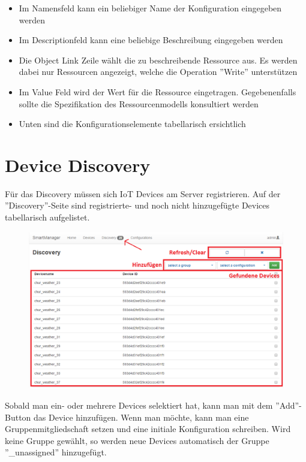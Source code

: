 \begin{itemize}
\item Im Namensfeld kann ein beliebiger Name der Konfiguration eingegeben werden
\item Im Descriptionfeld kann eine beliebige Beschreibung eingegeben werden
\item Die Object Link Zeile wählt die zu beschreibende Ressource aus. Es werden dabei nur Ressourcen angezeigt, welche die Operation ''Write'' unterstützen
\item Im Value Feld wird der Wert für die Ressource eingetragen. Gegebenenfalls sollte die Spezifikation des Ressourcenmodells konsultiert werden
\item Unten sind die Konfigurationselemente tabellarisch ersichtlich
\end{itemize}

\section{Device Discovery}
Für das Discovery müssen sich IoT Devices am Server registrieren. Auf der ''Discovery''-Seite sind registrierte- und noch nicht hinzugefügte Devices tabellarisch aufgelistet.

\begin{figure}[H]
\includegraphics[scale=0.57]{../05_Schlussbericht/images/benutzeranleitung/discovery.png}
\end{figure}  

Sobald man ein- oder mehrere Devices selektiert hat, kann man mit dem ''Add''-Button das Device hinzufügen. Wenn man möchte, kann man eine Gruppenmitgliedschaft setzen und eine initiale Konfiguration schreiben. Wird keine Gruppe gewählt, so werden neue Devices automatisch der Gruppe ''\_unassigned'' hinzugefügt.

